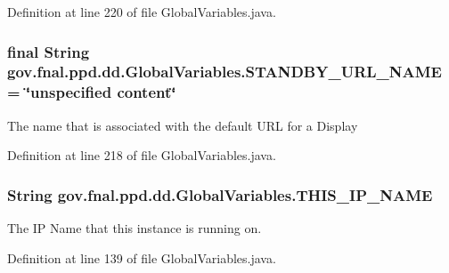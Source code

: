 Definition at line 220 of file Global\-Variables.\-java.

\hypertarget{classgov_1_1fnal_1_1ppd_1_1dd_1_1GlobalVariables_a95b7cd98e8cf8f461bff828889a3e6f0}{
\subsubsection[{S\-T\-A\-N\-D\-B\-Y\-\_\-\-U\-R\-L\-\_\-\-N\-A\-M\-E}]{\setlength{\rightskip}{0pt plus 5cm}final String gov.\-fnal.\-ppd.\-dd.\-Global\-Variables.\-S\-T\-A\-N\-D\-B\-Y\-\_\-\-U\-R\-L\-\_\-\-N\-A\-M\-E = \char`\"{}unspecified content\char`\"{}\hspace{0.3cm}{\ttfamily [static]}}}\label{classgov_1_1fnal_1_1ppd_1_1dd_1_1GlobalVariables_a95b7cd98e8cf8f461bff828889a3e6f0}
The name that is associated with the default U\-R\-L for a Display 

Definition at line 218 of file Global\-Variables.\-java.

\hypertarget{classgov_1_1fnal_1_1ppd_1_1dd_1_1GlobalVariables_a35adf140ccbaaf275e34d1539424828a}{
\subsubsection[{T\-H\-I\-S\-\_\-\-I\-P\-\_\-\-N\-A\-M\-E}]{\setlength{\rightskip}{0pt plus 5cm}String gov.\-fnal.\-ppd.\-dd.\-Global\-Variables.\-T\-H\-I\-S\-\_\-\-I\-P\-\_\-\-N\-A\-M\-E\hspace{0.3cm}{\ttfamily [static]}}}\label{classgov_1_1fnal_1_1ppd_1_1dd_1_1GlobalVariables_a35adf140ccbaaf275e34d1539424828a}
The I\-P Name that this instance is running on. 

Definition at line 139 of file Global\-Variables.\-java.

